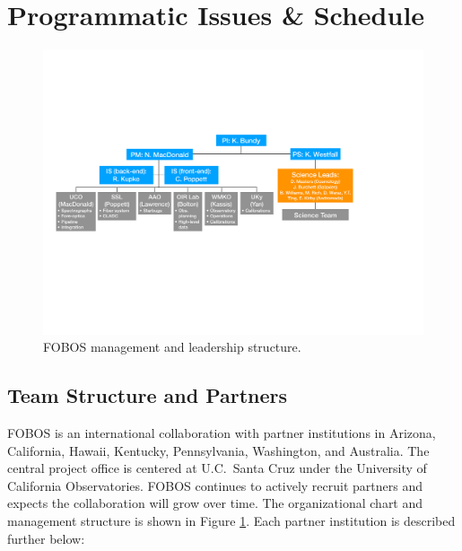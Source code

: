 \documentclass[oneside,11pt]{amsart}
\begin{document}
\bigskip
\section{Programmatic Issues \& Schedule}

\begin{figure}[h!]
\vskip -0.1in
\includegraphics[width=\textwidth]{org_chart_v2.pdf}
\caption{\small FOBOS management and leadership structure.}
\label{fig:org}
\end{figure}



\subsection{Team Structure and Partners}

FOBOS is an international collaboration with partner institutions in Arizona, California, Hawaii, Kentucky, Pennsylvania, Washington, and Australia.  The central project office is centered at U.C.\ Santa Cruz under the University of California Observatories.  FOBOS continues to actively recruit partners and expects the collaboration will grow over time.  The organizational chart and management structure is shown in Figure \ref{fig:org}.  Each partner institution is described further below:
\end{document}

